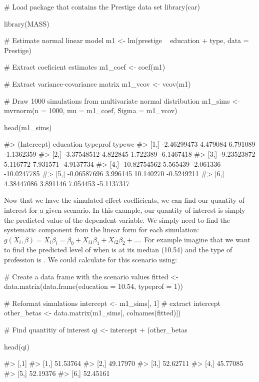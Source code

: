 \begin{Schunk}
\begin{Sinput}
# Load package that contains the Prestige data set
library(car)

library(MASS)

# Estimate normal linear model
m1 <- lm(prestige ~ education + type, data = Prestige)

# Extract coeficient estimates
m1_coef <- coef(m1)

# Extract variance-covariance matrix
m1_vcov <- vcov(m1)

# Draw 1000 simulations from multivariate normal distribution
m1_sims <- mvrnorm(n = 1000, mu = m1_coef, Sigma = m1_vcov)

head(m1_sims)
\end{Sinput}
\begin{Soutput}
#>       (Intercept) education  typeprof      typewc
#> [1,]  -2.46299473  4.479084  6.791089  -1.1362359
#> [2,]  -3.37548512  4.822845  1.722389  -6.1467418
#> [3,]  -9.23523872  5.116772  7.931571  -4.9137734
#> [4,] -10.82754562  5.565439 -2.061336 -10.0247785
#> [5,]  -0.06587696  3.996145 10.140270  -0.5249211
#> [6,]   4.38447086  3.891146  7.054453  -5.1137317
\end{Soutput}
\end{Schunk}

Now that we have the simulated effect coefficients, we can find our
quantity of interest for a given scenario. In this example, our quantity
of interest is simply the predicted value of the 
dependent variable. We simply need to find the systematic component from
the linear form for each simulation:
\(g(X_{i}, \beta) = X_{i}\beta_{i} = \beta_{0} + X_{i1}\beta_{1} + X_{i2}\beta_{2} + \ldots\).
For example imagine that we want to find the predicted level of
 when  is at its median (10.54) and the
type of profession is . We could calculate 
for this scenario using:

\begin{Schunk}
\begin{Sinput}
# Create a data frame with the scenario values
fitted <- data.matrix(data.frame(education = 10.54, typeprof = 1))

# Reformat simulations
intercept <- m1_sims[, 1] # extract intercept
other_betas <- data.matrix(m1_sims[, colnames(fitted)]) 

# Find quantitiy of interest
qi <- intercept + (other_betas %

head(qi)
\end{Sinput}
\begin{Soutput}
#>          [,1]
#> [1,] 51.53764
#> [2,] 49.17970
#> [3,] 52.62711
#> [4,] 45.77085
#> [5,] 52.19376
#> [6,] 52.45161
\end{Soutput}
\end{Schunk}

